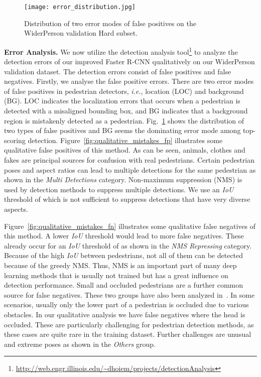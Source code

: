 \documentclass[journal]{IEEEtran}
\def\ie{{\em i.e.}}
\begin{document}
\begin{figure}[t]
\centering
\texttt{[image: error\_distribution.jpg]}
\caption{Distribution of two error modes of false positives on the WiderPerson validation Hard subset.}
\label{fig:err_dist}
\end{figure}

{\flushleft \textbf{Error Analysis. }}
We now utilize the detection analysis tool\footnote{\url{http://web.engr.illinois.edu/~dhoiem/projects/detectionAnalysis}} to analyze the detection errors of our improved Faster R-CNN qualitatively on our WiderPerson validation dataset. The detection errors consist of false positives and false negatives. Firstly, we analyse the false positive errors. There are two error modes of false positives in pedestrian detectors, \ie, location (LOC) and background (BG). LOC indicates the localization errors that occurs when a pedestrian is detected with a misaligned bounding box, and BG indicates that a background region is mistakenly detected as a pedestrian. Fig.~\ref{fig:err_dist} shows the distribution of two types of false positives and BG seems the dominating error mode among top-scoring detection. Figure~\ref{fig:qualitative_mistakes_fp} illustrates some qualitative false positives of this method. As can be seen, animals, clothes and fakes are principal sources for confusion with real pedestrians. Certain pedestrian poses and aspect ratios can lead to multiple detections for the same pedestrian as shown in the \textit{Multi Detections} category. Non-maximum suppression (NMS) is used by detection methods to suppress multiple detections. We use an \textit{IoU} threshold of  which is not sufficient to suppress detections that have very diverse aspects.

Figure~\ref{fig:qualitative_mistakes_fn} illustrates some qualitative false negatives of this method. A lower \textit{IoU} threshold would lead to more false negatives. These already occur for an \textit{IoU} threshold of  as shown in the \textit{NMS Repressing} category. Because of the high \textit{IoU} between pedestrians, not all of them can be detected because of the greedy NMS. Thus, NMS is an important part of many deep learning methods that is usually not trained but has a great influence on detection performance. Small and occluded pedestrians are a further common source for false negatives. These two groups have also been analyzed in~\cite{DBLP:conf/itsc/RajaramOT15}. In some scenarios, usually only the lower part of a pedestrian is occluded due to various obstacles. In our qualitative analysis we have false negatives where the head is occluded. These are particularly challenging for pedestrian detection methods, as these cases are quite rare in the training dataset. Further challenges are unusual and extreme poses as shown in the \textit{Others} group.
\end{document}
